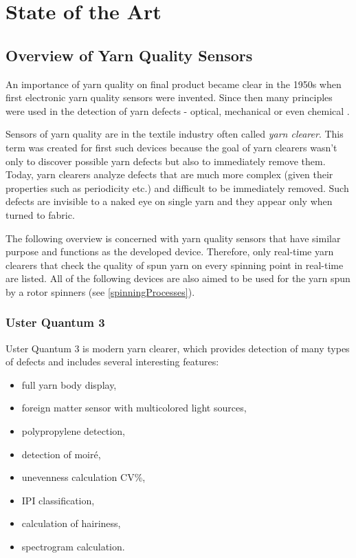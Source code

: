 \documentclass[twoside]{ctuthesis}
\theoremstyle{plain}
\theoremstyle{definition}
\theoremstyle{note}
\begin{document}
\section{State of the Art}


\subsection{Overview of Yarn Quality Sensors}
An importance of yarn quality on final product became clear in the 1950s when first electronic yarn quality sensors were invented. Since then many principles were used in the detection of yarn defects - optical, mechanical or even chemical \cite{cite:1}.

Sensors of yarn quality are in the textile industry often called \textit{yarn clearer}. This term was created for first such devices because the goal of yarn clearers wasn't only to discover possible yarn defects but also to immediately remove them. Today, yarn clearers analyze defects that are much more complex (given their properties such as periodicity etc.) and difficult to be immediately removed. Such defects are invisible to a naked eye on single yarn and they appear only when turned to fabric.

The following overview is concerned with yarn quality sensors that have similar purpose and functions as the developed device. Therefore, only real-time yarn clearers that check the quality of spun yarn on every spinning point in real-time are listed. All of the following devices are also aimed to be used for the yarn spun by a rotor spinners (see \ref{spinningProcesses}).

\subsubsection{Uster Quantum 3}
Uster Quantum 3 is modern yarn clearer, which provides detection of many types of defects and includes several interesting features:

\begin{itemize}
	\setlength{\itemsep}{5pt}
	\item full yarn body display,
	\item foreign matter sensor with multicolored light sources,
	\item polypropylene detection,
	\item detection of moiré,
	\item unevenness calculation CV\%,
	\item IPI classification,
	\item calculation of hairiness,
	\item spectrogram calculation.
\end{itemize}
\end{document}
